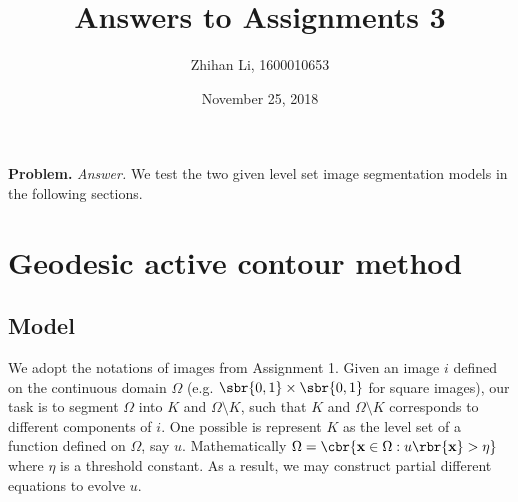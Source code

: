 \documentclass[english, nochinese]{pnote}
\title{Answers to Assignments 3}
\author{Zhihan Li, 1600010653}
\date{November 25, 2018}
\begin{document}
\maketitle

\textbf{Problem.} \textit{Answer.} We test the two given level set image segmentation models in the following sections.

\section{Geodesic active contour method}

\subsection{Model}

We adopt the notations of images from Assignment 1. Given an image $i$ defined on the continuous domain $\Omega$ (e.g. $ \sbr{ 0, 1 } \times \sbr{ 0, 1 } $ for square images), our task is to segment $\Omega$ into $K$ and $ \Omega \setminus K $, such that $K$ and $ \Omega \setminus K $ corresponds to different components of $i$. One possible is represent $K$ as the level set of a function defined on $\Omega$, say $u$. Mathematically $ \Omega = \cbr{ \mathbf{x} \in \Omega : u \rbr{\mathbf{x}} > \eta } $ where $\eta$ is a threshold constant. As a result, we may construct partial different equations to evolve $u$.
\end{document}
